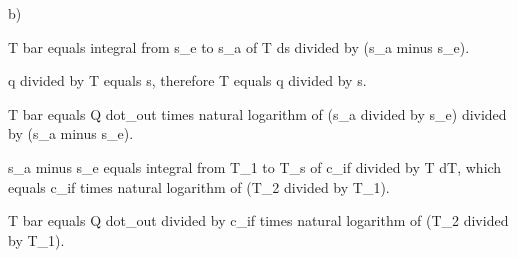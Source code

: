 b)  

T bar equals integral from s_e to s_a of T ds divided by (s_a minus s_e).  

q divided by T equals s, therefore T equals q divided by s.  

T bar equals Q dot_out times natural logarithm of (s_a divided by s_e) divided by (s_a minus s_e).  

s_a minus s_e equals integral from T_1 to T_s of c_if divided by T dT, which equals c_if times natural logarithm of (T_2 divided by T_1).  

T bar equals Q dot_out divided by c_if times natural logarithm of (T_2 divided by T_1).